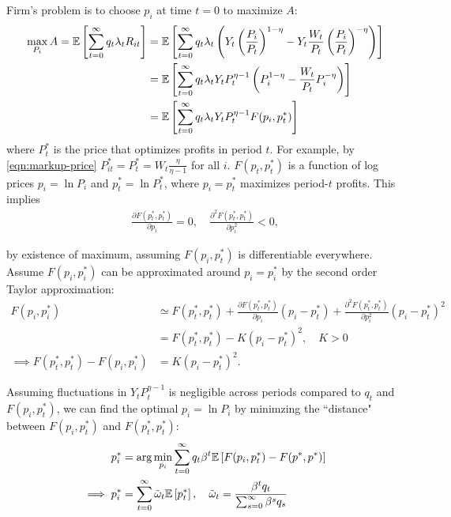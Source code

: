 \documentclass[../main.tex]{subfiles}
\begin{document}
        Firm's problem is to choose $p_i$ at time $t=0$ to maximize $A$:
        \begin{align}
            \max_{P_i} A = \mathbb{E}\left[\sum_{t=0}^\infty q_t \lambda_t R_{it}\right]
            &= \mathbb{E}\left[\sum_{t=0}^\infty q_t \lambda_t
            \left(
                Y_t \left(\frac{{P_i}}{P_t}\right)^{1-\eta} - Y_t\frac{W_t}{P_t} \left(\frac{{P_i}}{P_t}\right)^{-\eta}
                \right)\right]
            \\
            &= \mathbb{E}\left[\sum_{t=0}^\infty q_t \lambda_t
            Y_t P_t^{\eta - 1}\left(
                P_i^{1-\eta} - \frac{W_t}{P_t} P_i^{-\eta}
                \right)\right]
            \\
            &= \mathbb{E}\left[\sum_{t=0}^\infty q_t \lambda_t
            Y_t P_t^{\eta - 1} F(p_i, p_t^*)\right]
        \end{align}
        where $P_t^*$ is the price that optimizes profits in period $t$.  For example, by \eqref{eqn:markup-price} $P_{it}^* = P_{t}^* = W_t\frac{\eta}{\eta-1}$ for all $i$. $F(p_t, p_t^*)$ is a function of log prices $p_i = \ln{P_i}$ and $p_t^* = \ln{P_t^*}$, where $p_i = p_t^*$ maximizes period-$t$ profits. This implies
        \begin{align}
            \frac{\partial F(p_t^*, p_t^*)}{\partial p_i} = 0,
            \quad
            \frac{\partial^2 F(p_t^*, p_t^*)}{\partial p_i^2} < 0,
        \end{align}
        
        by existence of maximum, assuming $F(p_i, p_t^*)$ is differentiable everywhere. Assume $F(p_i, p_i^*)$ can be approximated around $p_i = p_i^*$ by the second order Taylor approximation:
        \begin{align}
            F(p_i, p_i^*)
            &\simeq F(p_t^*, p_t^*) +  \frac{\partial F(p_t^*, p_t^*)}{\partial p_i} (p_i - p_t^*) + \frac{\partial^2 F(p_t^*, p_t^*)}{\partial p_i^2} (p_i - p_t^*)^2
            \\
            &= F(p_t^*, p_t^*) - K (p_i - p_t^*)^2, \quad K > 0
            \\
            \implies
            F(p_t^*, p_t^*) - F(p_i, p_i^*) &= K(p_i - p_t^*)^2.
        \end{align}
        
        Assuming fluctuations in $Y_t P_t^{\eta - 1}$ is negligible across periods compared to $q_t$ and $F(p_i, p_t^*)$, we can find the optimal $p_i = \ln P_i$ by minimzing the ``distance" between $F(p_i, p_t^*)$ and $F(p_t^*, p_t^*)$:
        \begin{align}
            p_i^*
            &= \arg\min_{p_i} \sum_{t=0}^\infty q_t \beta^t \mathbb{E}\left[F(p_i, p_t^*) - F(p^*, p^*)\right]
            \\
            \implies p_i^*
            &= \sum_{t=0}^\infty \tilde\omega_t \mathbb{E}\left[p_t^*\right], \quad
            \tilde\omega_t = \frac{\beta^t q_t}{\sum_{s=0}^\infty \beta^s q_s}
            \label{eqn:p-star}
        \end{align}
        
\end{document}

